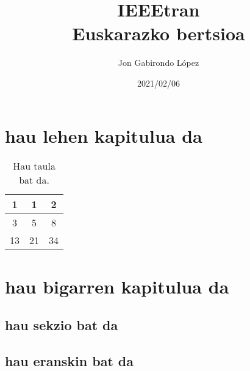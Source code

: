 \documentclass[11pt,a4paper,twoside]{report}
\title{IEEEtran\\Euskarazko bertsioa}
\author{Jon Gabirondo López}
\date{2021/02/06}
\begin{document}

\tableofcontents

\chapter{hau lehen kapitulua da}

\begin{table}[H]
\center
\begin{tabular}{|c|c|c|}
\hline
1  & 1  & 2  \\ \hline
3  & 5  & 8  \\ \hline
13 & 21 & 34 \\ \hline
\end{tabular}
\caption{Hau taula bat da.}
\end{table}

\chapter{hau bigarren kapitulua da}

\section{hau sekzio bat da}

\nocite{*}




\begin{appendices}

\chapter{hau eranskin bat da}

\end{appendices}
\end{document}
